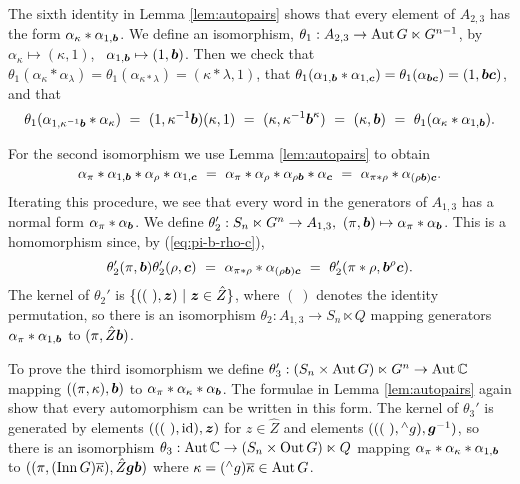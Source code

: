 \begin{pf} 
The sixth identity in Lemma \ref{lem:autopairs} shows that every element 
of $A_{2,3}$ has the form $\alpha_{\kappa}*\alpha_{1,\boldsymbol{b}}$. 
We define an isomorphism, 
$\theta_1 : A_{2,3} \to \mathrm{Aut}\,G \ltimes G^{n-1}$, by 
$\alpha_{\kappa} \mapsto (\kappa,1)$,~ $\alpha_{1,\boldsymbol{b}} \mapsto (1,\boldsymbol{b})$. 
Then we check that 
$\theta_1(\alpha_{\kappa}*\alpha_{\lambda}) 
 = \theta_1(\alpha_{\kappa*\lambda}) 
 = (\kappa*\lambda,1)$, that 
$\theta_1(\alpha_{1,\boldsymbol{b}}*\alpha_{1,\boldsymbol{c}}) 
 = \theta_1(\alpha_{\boldsymbol{b}\boldsymbol{c}}) 
 = (1,\boldsymbol{b}\boldsymbol{c})$, and that 
$$
\theta_1(\alpha_{1,\kappa^{-1}\boldsymbol{b}}*\alpha_{\kappa}) 
~=~ (1,\kappa^{-1}\boldsymbol{b})(\kappa,1) 
~=~ (\kappa,\kappa^{-1}\boldsymbol{b}^{\kappa}) 
~=~ (\kappa,\boldsymbol{b}) 
~=~ \theta_1(\alpha_{\kappa}*\alpha_{1,\boldsymbol{b}}). 
$$

\medskip\noindent 
For the second isomorphism we use Lemma \ref{lem:autopairs} to obtain  
\begin{equation} \label{eq:pi-b-rho-c}
\alpha_{\pi} * \alpha_{1,\boldsymbol{b}} * \alpha_{\rho} * \alpha_{1,\boldsymbol{c}} 
~=~ \alpha_{\pi} * \alpha_{\rho} * \alpha_{\rho\boldsymbol{b}} * \alpha_{\boldsymbol{c}} 
~=~ \alpha_{\pi*\rho} * \alpha_{(\rho\boldsymbol{b})\boldsymbol{c}}.
\end{equation}
Iterating this procedure, we see that every word in the generators 
of $A_{1,3}$ has a normal form $\alpha_{\pi}*\alpha_{\boldsymbol{b}}$. 
We define  
$\theta_2' : S_n \ltimes G^n \to A_{1,3},~ 
             (\pi,\boldsymbol{b}) \mapsto \alpha_{\pi}*\alpha_{\boldsymbol{b}}$.  
This is a homomorphism since, by (\ref{eq:pi-b-rho-c}), 
$$
\theta_2'(\pi,\boldsymbol{b})\theta_2'(\rho,\boldsymbol{c}) 
~=~ \alpha_{\pi*\rho} * \alpha_{(\rho\boldsymbol{b})\boldsymbol{c}} 
~=~ \theta_2'(\pi*\rho,\boldsymbol{b}^{\rho}\boldsymbol{c}). 
$$
The kernel of $\theta_2'$ is $\{((~),\boldsymbol{z}) ~|~ \boldsymbol{z} \in \hat{Z}\}$, 
where $(~)$ denotes the identity permutation, 
so there is an isomorphism $\theta_2 : A_{1,3} \to S_n \ltimes Q$ 
mapping generators $\alpha_{\pi}*\alpha_{1,\boldsymbol{b}}$ 
to $(\pi,\hat{Z}\boldsymbol{b})$. 

\medskip 
To prove the third isomorphism we define 
$\theta_3' : (S_n \times \mathrm{Aut}\,G) \ltimes G^n \to \mathrm{Aut}\,\mathbb{C}$ 
mapping $((\pi,\kappa),\boldsymbol{b})$ 
to $\alpha_{\pi}*\alpha_{\kappa}*\alpha_{\boldsymbol{b}}$. 
The formulae in Lemma \ref{lem:autopairs} again show that every 
automorphism can be written in this form. 
The kernel of $\theta_3'$ is generated by elements 
$(((~),\mathrm{id}),\boldsymbol{z})$ for $z \in \hat{Z}$ 
and elements $(((~),{}^{\wedge} g),\boldsymbol{g}^{-1})$, 
so there is an isomorphism 
$\theta_3 : \mathrm{Aut}\,\mathbb{C} \to (S_n \times \mathrm{Out}\,G) \ltimes Q$ 
mapping $\alpha_{\pi}*\alpha_{\kappa}*\alpha_{1,\boldsymbol{b}}$ 
to $((\pi,(\mathrm{Inn}\,G)\overline{\kappa}),\hat{Z}\boldsymbol{g}\boldsymbol{b})$ 
where $\kappa = ({}^{\wedge} g)\overline{\kappa} \in \mathrm{Aut}\,G$. 
\end{pf}

